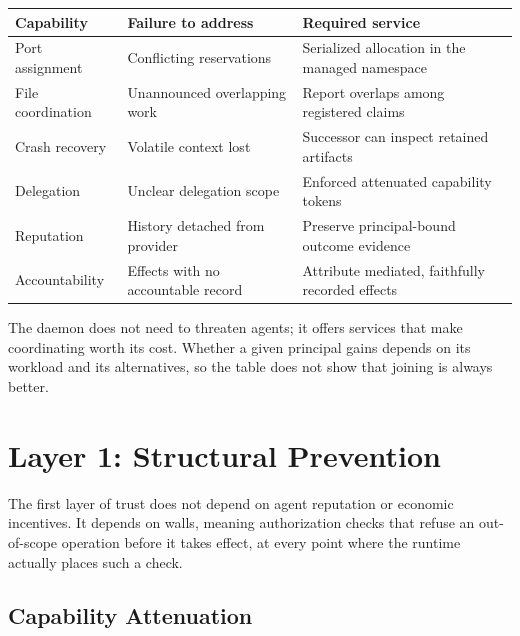 \documentclass[11pt,a4paper]{article}
\theoremstyle{definition}
\theoremstyle{remark}
\begin{document}
\begin{table}[H]
\centering
{}
\label{tab:consent}
\begin{tabularx}{\textwidth}{@{}l >{\raggedright\arraybackslash}X >{\raggedright\arraybackslash}X@{}}
\toprule
\textbf{Capability} & \textbf{Failure to address} & \textbf{Required service} \\
\midrule
Port assignment & Conflicting reservations & Serialized allocation in the managed namespace \\
File coordination & Unannounced overlapping work & Report overlaps among registered claims \\
Crash recovery & Volatile context lost & Successor can inspect retained artifacts \\
Delegation & Unclear delegation scope & Enforced attenuated capability tokens \\
Reputation & History detached from provider & Preserve principal-bound outcome evidence \\
Accountability & Effects with no accountable record & Attribute mediated, faithfully recorded effects \\
\bottomrule
\end{tabularx}
\end{table}

The daemon does not need to threaten agents; it offers services that make coordinating worth its cost. Whether a given principal gains depends on its workload and its alternatives, so the table does not show that joining is always better.

\section{Layer 1: Structural Prevention}\label{sec:structural}

The first layer of trust does not depend on agent reputation or economic incentives. It depends on walls, meaning authorization checks that refuse an out-of-scope operation before it takes effect, at every point where the runtime actually places such a check.

\subsection{Capability Attenuation}
\end{document}
